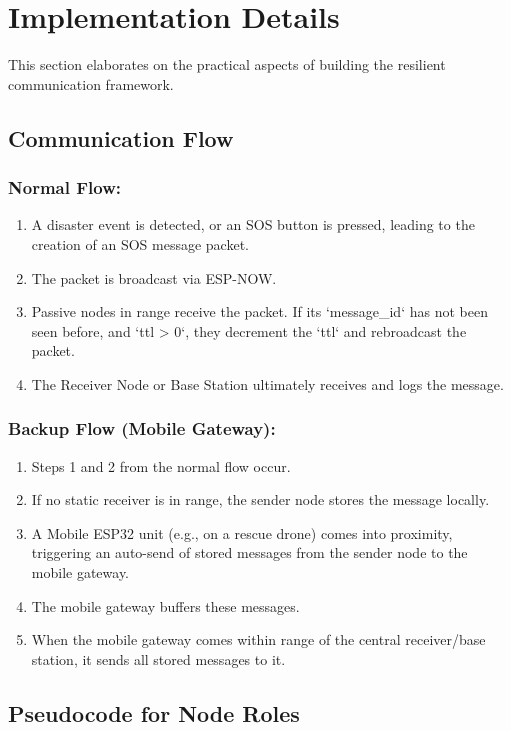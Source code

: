 \documentclass[12pt, a4paper]{article}
\begin{document}
\section{Implementation Details}
This section elaborates on the practical aspects of building the resilient communication framework.

\subsection{Communication Flow}
\subsubsection{Normal Flow:}
\begin{enumerate}
    \item A disaster event is detected, or an SOS button is pressed, leading to the creation of an SOS message packet.
    \item The packet is broadcast via ESP-NOW.
    \item Passive nodes in range receive the packet. If its `message_id` has not been seen before, and `ttl > 0`, they decrement the `ttl` and rebroadcast the packet.
    \item The Receiver Node or Base Station ultimately receives and logs the message.
\end{enumerate}

\subsubsection{Backup Flow (Mobile Gateway):}
\begin{enumerate}
    \item Steps 1 and 2 from the normal flow occur.
    \item If no static receiver is in range, the sender node stores the message locally.
    \item A Mobile ESP32 unit (e.g., on a rescue drone) comes into proximity, triggering an auto-send of stored messages from the sender node to the mobile gateway.
    \item The mobile gateway buffers these messages.
    \item When the mobile gateway comes within range of the central receiver/base station, it sends all stored messages to it.
\end{enumerate}

\subsection{Pseudocode for Node Roles}
\end{document}
